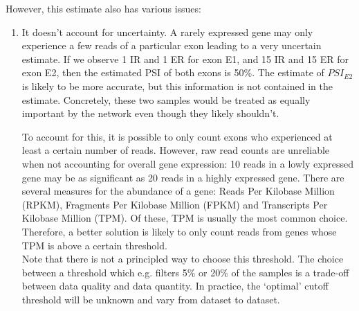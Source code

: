 However, this estimate also has various issues:
\begin{enumerate}[label=(\alph*)]
	\item It doesn't account for uncertainty. A rarely expressed gene may only experience a few reads of a particular exon leading to a very uncertain estimate. If we observe 1 IR and 1 ER for exon E1, and 15 IR and 15 ER for exon E2, then the estimated PSI of both exons is 50\%.
	The estimate of $PSI_{E2}$ is likely to be more accurate, but this information is not contained in the estimate. Concretely, these two samples would be treated as equally important by the network even though they likely shouldn't.
	
	To account for this, it is possible to only count exons who experienced at least a certain number of reads. However, raw read counts are unreliable when not accounting for overall gene expression: 10 reads in a lowly expressed gene may be as significant as 20 reads in a highly expressed gene. There are several measures for the abundance of a gene: Reads Per Kilobase Million (RPKM), Fragments Per Kilobase Million (FPKM) and Transcripts Per Kilobase Million (TPM). Of these, TPM is usually the most common choice. Therefore, a better solution is likely to only count reads from genes whose TPM is above a certain threshold. \\
	Note that there is not a principled way to choose this threshold. The choice between a threshold which e.g. filters 5\% or 20\% of the samples is a trade-off between data quality and data quantity. In practice, the `optimal' cutoff threshold will be unknown and vary from dataset to dataset.
	

\end{enumerate}
